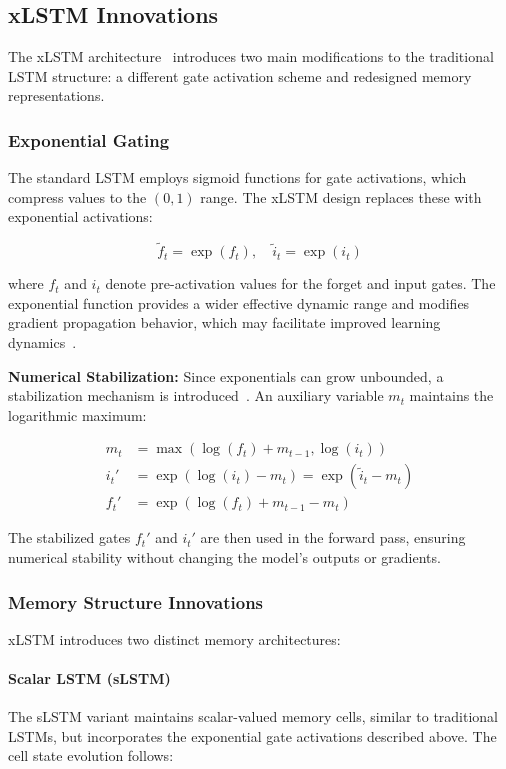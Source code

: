 \subsection{xLSTM Innovations}

The xLSTM architecture~\cite{beck2024xlstm} introduces two main modifications to the traditional LSTM structure: a different gate activation scheme and redesigned memory representations.

\subsubsection{Exponential Gating}

The standard \ac{LSTM} employs sigmoid functions for gate activations, which compress values to the $(0,1)$ range. The xLSTM design replaces these with exponential activations:

$$\tilde{f}_t = \exp(f_t), \quad \tilde{i}_t = \exp(i_t)$$

where $f_t$ and $i_t$ denote pre-activation values for the forget and input gates. The exponential function provides a wider effective dynamic range and modifies gradient propagation behavior, which may facilitate improved learning dynamics~\cite{beck2024xlstm}.

\textbf{Numerical Stabilization:} Since exponentials can grow unbounded, a stabilization mechanism is introduced~\cite{beck2024xlstm}. An auxiliary variable $m_t$ maintains the logarithmic maximum:

\begin{align}
m_t &= \max(\log(f_t) + m_{t-1}, \log(i_t)) \\
i_t' &= \exp(\log(i_t) - m_t) = \exp(\tilde{i}_t - m_t) \\
f_t' &= \exp(\log(f_t) + m_{t-1} - m_t)
\end{align}

The stabilized gates $f_t'$ and $i_t'$ are then used in the forward pass, ensuring numerical stability without changing the model's outputs or gradients.

\subsubsection{Memory Structure Innovations}

\ac{xLSTM} introduces two distinct memory architectures:

\paragraph{Scalar LSTM (sLSTM)}
The \ac{sLSTM} variant maintains scalar-valued memory cells, similar to traditional \acp{LSTM}, but incorporates the exponential gate activations described above. The cell state evolution follows:

